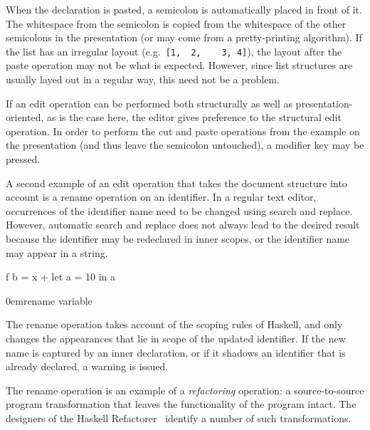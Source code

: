 \documentclass{entcs}
\begin{document}


When the declaration is pasted, a semicolon is automatically placed in front of it. The whitespace from the semicolon is copied from the whitespace of the other semicolons in the presentation (or may come from a pretty-printing algorithm). If the list has an irregular layout (e.g.\ \verb|[1,  2,    3, 4]|), the layout after the paste operation may not be what is expected. However, since list structures are usually layed out in a regular way, this need not be a problem.

If an edit operation can be performed both structurally as well as presentation-oriented, as is the case here, the editor gives preference to the structural edit operation. In order to perform the cut and paste operations from the example on the presentation (and thus leave the semicolon untouched), a modifier key may be pressed.



A second example of an edit operation that takes the document structure into account is a rename operation on an identifier. In a regular text editor, occurrences of the identifier name need to be changed using search and replace. However, automatic search and replace does not always lead to the desired result because the identifier may be redeclared in inner scopes, or the identifier name may appear in a string.

{\begin{scriptsize} f  b = x + let a = 10 in a \end{scriptsize}}
{0em}{\small rename variable}

The rename operation takes account of the scoping rules of Haskell, and only changes the appearances that lie in scope of the updated identifier. If the new name is captured by an inner declaration, or if it shadows an identifier that is already declared, a warning is issued.

The rename operation is an example of a {\em refactoring} operation: a source-to-source program transformation that leaves  the functionality of the program intact. The designers of the Haskell Refactorer~\cite{reinke03refactoring} identify a number of such transformations.
\end{document}
